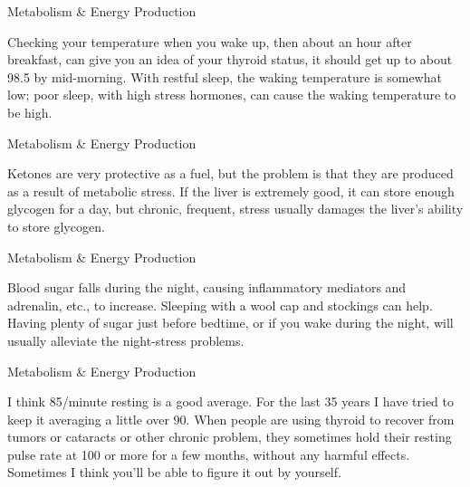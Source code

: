 \documentclass[11pt,oneside,openany,extrafontsizes]{memoir}
\begin{document}
\begin{standalonequote}{Metabolism \& Energy Production}

    \begin{answer}
        Checking your temperature when you wake up, then about an hour after breakfast, can give you an idea of your thyroid status, it should get up to about 98.5 by mid-morning. With restful sleep, the waking temperature is somewhat low; poor sleep, with high stress hormones, can cause the waking temperature to be high.
    \end{answer}
\end{standalonequote}

\begin{standalonequote}{Metabolism \& Energy Production}

    \begin{answer}
        Ketones are very protective as a fuel, but the problem is that they are produced as a result of metabolic stress. If the liver is extremely good, it can store enough glycogen for a day, but chronic, frequent, stress usually damages the liver's ability to store glycogen.
    \end{answer}
\end{standalonequote}

\begin{standalonequote}{Metabolism \& Energy Production}

    \begin{answer}
        Blood sugar falls during the night, causing inflammatory mediators and adrenalin, etc., to increase. Sleeping with a wool cap and stockings can help. Having plenty of sugar just before bedtime, or if you wake during the night, will usually alleviate the night-stress problems.
    \end{answer}
\end{standalonequote}

\begin{standalonequote}{Metabolism \& Energy Production}

    \begin{answer}
        I think 85/minute resting is a good average. For the last 35 years I have tried to keep it averaging a little over 90. When people are using thyroid to recover from tumors or cataracts or other chronic problem, they sometimes hold their resting pulse rate at 100 or more for a few months, without any harmful effects. Sometimes I think you'll be able to figure it out by yourself.
    \end{answer}
\end{standalonequote}
\end{document}
